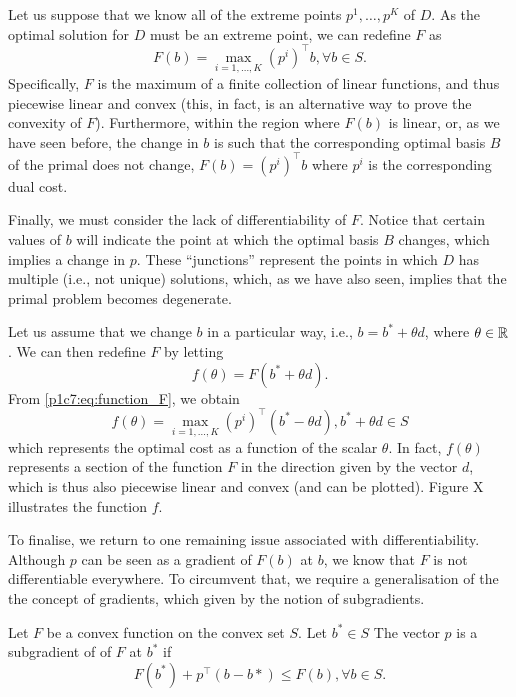 Let us suppose that we know all of the extreme points $p^1, \dots, p^K$ of $D$. As the optimal solution for $D$ must be an extreme point, we can redefine $F$ as
%
\begin{equation} \label{p1c7:eq:function_F}
	F(b) = \max_{i = 1, \dots, K} (p^i)^\top b, \forall b \in S.
\end{equation}
%
Specifically, $F$ is the maximum of a finite collection of linear functions, and thus piecewise linear and convex (this, in fact, is an alternative way to prove the convexity of $F$). Furthermore, within the region where $F(b)$ is linear, or, as we have seen before, the change in $b$ is such that the corresponding optimal basis $B$ of the primal does not change, $F(b) = (p^i)^\top b$ where $p^i$ is the corresponding dual cost.

Finally, we must consider the lack of differentiability of $F$. Notice that certain values of $b$ will indicate the point at which the optimal basis $B$ changes, which implies a change in $p$. These ``junctions'' represent the points in which $D$ has multiple (i.e., not unique) solutions, which, as we have also seen, implies that the primal problem becomes degenerate.

Let us assume that we change $b$ in a particular way, i.e., $b = b^* + \theta d$, where $\theta \in \mathbb{R}$. We can then redefine $F$ by letting 
%
\begin{equation*}
	f(\theta) = F(b^* + \theta d).
\end{equation*}
%
From \eqref{p1c7:eq:function_F}, we obtain
%
\begin{equation*}
	f(\theta) = \max_{i = 1, \dots, K} (p^i)^\top (b^* - \theta d), b^* + \theta d \in S
\end{equation*}
%
which represents the optimal cost as a function of the scalar $\theta$. In fact, $f(\theta)$ represents a section of the function $F$ in the direction given by the vector $d$, which is thus also piecewise linear and convex (and can be plotted). Figure X illustrates the function $f$.

To finalise, we return to one remaining issue associated with differentiability. Although $p$ can be seen as a gradient of $F(b)$ at $b$, we know that $F$ is not differentiable everywhere. To circumvent that, we require a generalisation of the the concept of gradients, which given by the notion of subgradients. 

\begin{definition}
	Let $F$ be a convex function on the convex set $S$. Let $b^* \in S$ The vector $p$ is a subgradient of of $F$ at $b^*$ if
	\begin{equation}
		F(b^*) + p^\top (b - b*) \le F(b), \forall b \in S.
	\end{equation}
\end{definition}

